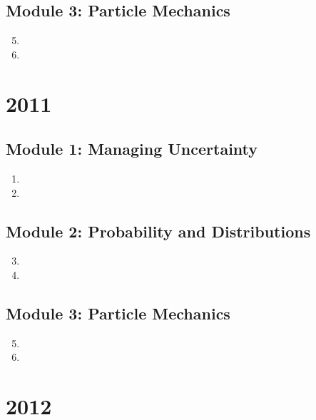 \documentclass[fleqn,titlepage]{book}
\numberwithin{equation}{section}
\theoremstyle{plain}
\theoremstyle{definition}
\theoremstyle{remark}
\begin{document}
\section{Module 3: Particle Mechanics}
\begin{enumerate}[label=\bfseries  \arabic*.]\setcounter{enumi}{4}
\item 
\item 
\end{enumerate}

\chapter{2011}
\section{Module 1: Managing Uncertainty}
\begin{enumerate}[label=\bfseries  \arabic*.]\setcounter{enumi}{0}
\item 
\item 
\end{enumerate}
\section{Module 2: Probability and Distributions}
\begin{enumerate}[label=\bfseries  \arabic*.]\setcounter{enumi}{2}
\item 
\item 
\end{enumerate}
\section{Module 3: Particle Mechanics}
\begin{enumerate}[label=\bfseries  \arabic*.]\setcounter{enumi}{4}
\item 
\item 
\end{enumerate}

\chapter{2012}
\end{document}

